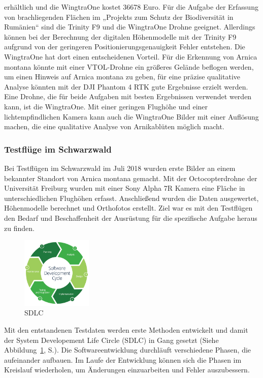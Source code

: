erhältlich und die WingtraOne kostet 36678 Euro. %
Für die Aufgabe der Erfassung von brachliegenden Flächen im „Projekts zum Schutz der Biodiversität in Rumänien“ sind die Trinity F9 und die WingtraOne Drohne geeignet. Allerdings können bei der Berechnung der digitalen Höhenmodelle mit der Trinity F9 aufgrund von der geringeren Positionierungsgenauigkeit Fehler entstehen. Die WingtraOne hat dort einen entscheidenen Vorteil. Für die Erkennung von Arnica montana könnte mit einer VTOL-Drohne ein größeres Gelände beflogen werden, um einen Hinweis auf Arnica montana zu geben, für eine präzise qualitative Analyse könnten mit der DJI Phantom 4 RTK gute Ergebnisse erzielt werden. Eine Drohne, die für beide Aufgaben mit besten Ergebnissen verwendet werden kann, ist die WingtraOne. Mit einer geringen Flughöhe und einer lichtempfindlichen Kamera kann auch die WingtraOne Bilder mit einer Auflösung machen, die eine qualitative Analyse von Arnikablüten möglich macht. 

\subsubsection{Testflüge im Schwarzwald}

Bei Testflügen im Schwarzwald im Juli 2018 wurden erste Bilder an einem bekannter Standort von Arnica montana gemacht. Mit der Octocopterdrohne der Universität Freiburg wurden mit einer Sony Alpha 7R Kamera eine Fläche in unterschiedlichen Flughöhen erfasst. Anschließend wurden die Daten ausgewertet, Höhenmodelle berechnet und Orthofotos erstellt. Ziel war es mit den Testflügen den Bedarf und Beschaffenheit der Ausrüstung für die spezifische Aufgabe heraus zu finden.

\begin{figure}
  \vspace{-30pt}
  \begin{center}
    \includegraphics[width=0.3\textwidth]{abb/SDLC}
  \end{center}
  \vspace{-20pt}
  \caption[System Developement Life Circle]{\small SDLC}
  \label{fig:sdlc}
  \vspace{-20pt}
\end{figure}
Mit den entstandenen Testdaten werden erste Methoden entwickelt und damit der System Developement Life Circle (SDLC) in Gang gesetzt (Siehe Abbildung~\ref{fig:sdlc}, S.\pageref{fig:sdlc}). Die Softwareentwicklung durchläuft verschiedene Phasen, die aufeinander aufbauen. Im Laufe der Entwicklung können sich die Phasen im Kreislauf wiederholen, um Änderungen einzuarbeiten und Fehler auszubessern. 


